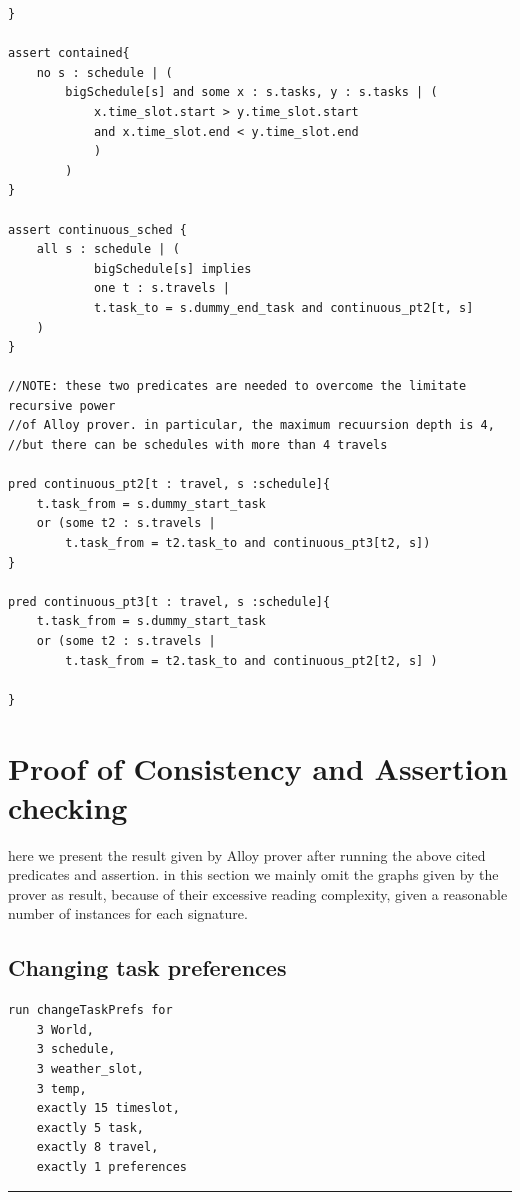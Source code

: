 \begin{verbatim}
}

assert contained{
    no s : schedule | (
        bigSchedule[s] and some x : s.tasks, y : s.tasks | (
            x.time_slot.start > y.time_slot.start 
            and x.time_slot.end < y.time_slot.end
            )
        )
}

assert continuous_sched {
    all s : schedule | (
            bigSchedule[s] implies
            one t : s.travels |
            t.task_to = s.dummy_end_task and continuous_pt2[t, s]
	)
}

//NOTE: these two predicates are needed to overcome the limitate recursive power
//of Alloy prover. in particular, the maximum recuursion depth is 4,
//but there can be schedules with more than 4 travels

pred continuous_pt2[t : travel, s :schedule]{
    t.task_from = s.dummy_start_task 
    or (some t2 : s.travels | 
        t.task_from = t2.task_to and continuous_pt3[t2, s]) 
}

pred continuous_pt3[t : travel, s :schedule]{
    t.task_from = s.dummy_start_task 
    or (some t2 : s.travels | 
        t.task_from = t2.task_to and continuous_pt2[t2, s] )

}

\end{verbatim}

\section{Proof of Consistency and Assertion checking}

here we present the result given by Alloy prover after running the above cited predicates and assertion. in this section we mainly omit the graphs given by the prover as result, because of their excessive reading complexity, given a reasonable number of instances for each signature.

\subsection{Changing task preferences}
\begin{verbatim}
run changeTaskPrefs for 
    3 World, 
    3 schedule, 
    3 weather_slot, 
    3 temp, 
    exactly 15 timeslot, 
    exactly 5 task, 
    exactly 8 travel, 
    exactly 1 preferences 
\end{verbatim}
\rule{\textwidth}{0.4pt}

